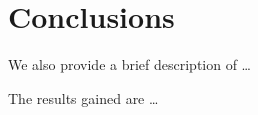 
\chapter{Conclusions}\label{ch:conclusion}





We also provide a brief description of \dots


The results gained are \dots

